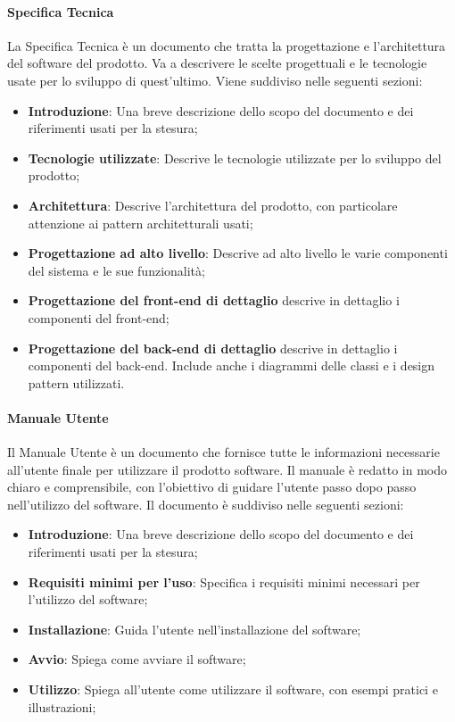 \paragraph{Specifica Tecnica}
La Specifica Tecnica è un documento che tratta la progettazione e l'architettura del software del prodotto. Va a descrivere le scelte progettuali e le tecnologie usate per lo sviluppo di quest'ultimo. 
Viene suddiviso nelle seguenti sezioni:
\begin{itemize}
    \item \textbf{Introduzione}: Una breve descrizione dello scopo del documento e dei riferimenti usati per la stesura;
    \item \textbf{Tecnologie utilizzate}: Descrive le tecnologie utilizzate per lo sviluppo del prodotto;
    \item \textbf{Architettura}: Descrive l'architettura del prodotto, con particolare attenzione ai pattern architetturali usati;
    \item \textbf{Progettazione ad alto livello}: Descrive ad alto livello le varie componenti del sistema e le sue funzionalità;
    \item \textbf{Progettazione del front-end di dettaglio} descrive in dettaglio i componenti del front-end;
    \item \textbf{Progettazione del back-end di dettaglio} descrive in dettaglio i componenti del back-end. Include anche i diagrammi delle classi e i design pattern utilizzati.
\end{itemize}

\paragraph{Manuale Utente}
Il Manuale Utente è un documento che fornisce tutte le informazioni necessarie all'utente finale per utilizzare il prodotto software. Il manuale è redatto in modo chiaro e comprensibile, con l'obiettivo di guidare l'utente passo dopo passo nell'utilizzo del software. 
Il documento è suddiviso nelle seguenti sezioni:
\begin{itemize}
    \item \textbf{Introduzione}: Una breve descrizione dello scopo del documento e dei riferimenti usati per la stesura;
    \item \textbf{Requisiti minimi per l'uso}: Specifica i requisiti minimi necessari per l'utilizzo del software;
    \item \textbf{Installazione}: Guida l'utente nell'installazione del software;
    \item \textbf{Avvio}: Spiega come avviare il software;
    \item \textbf{Utilizzo}: Spiega all'utente come utilizzare il software, con esempi pratici e illustrazioni;
\end{itemize}


